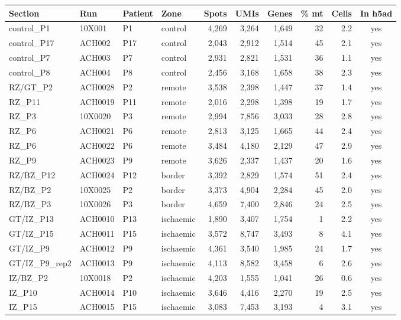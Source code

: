 \begin{longtable}{llllrrrrrc}
\toprule
Section & Run & Patient & Zone & Spots & UMIs & Genes & \% mt & Cells & In h5ad \\
\midrule
\endhead
control\_P1 & 10X001 & P1 & control & 4,269 & 3,264 & 1,649 & 32 & 2.2 & yes \\
control\_P17 & ACH002 & P17 & control & 2,043 & 2,912 & 1,514 & 45 & 2.1 & yes \\
control\_P7 & ACH003 & P7 & control & 2,931 & 2,821 & 1,531 & 36 & 1.1 & yes \\
control\_P8 & ACH004 & P8 & control & 2,456 & 3,168 & 1,658 & 38 & 2.3 & yes \\
RZ/GT\_P2 & ACH0028 & P2 & remote & 3,538 & 2,398 & 1,447 & 37 & 1.4 & yes \\
RZ\_P11 & ACH0019 & P11 & remote & 2,016 & 2,298 & 1,398 & 19 & 1.7 & yes \\
RZ\_P3 & 10X0020 & P3 & remote & 2,994 & 7,856 & 3,033 & 28 & 2.8 & yes \\
RZ\_P6 & ACH0021 & P6 & remote & 2,813 & 3,125 & 1,665 & 44 & 2.4 & yes \\
RZ\_P6 & ACH0022 & P6 & remote & 3,484 & 4,180 & 2,129 & 47 & 2.9 & yes \\
RZ\_P9 & ACH0023 & P9 & remote & 3,626 & 2,337 & 1,437 & 20 & 1.6 & yes \\
RZ/BZ\_P12 & ACH0024 & P12 & border & 3,392 & 2,829 & 1,574 & 51 & 2.4 & yes \\
RZ/BZ\_P2 & 10X0025 & P2 & border & 3,373 & 4,904 & 2,284 & 45 & 2.0 & yes \\
RZ/BZ\_P3 & 10X0026 & P3 & border & 4,659 & 7,400 & 2,846 & 24 & 2.5 & yes \\
GT/IZ\_P13 & ACH0010 & P13 & ischaemic & 1,890 & 3,407 & 1,754 & 1 & 2.2 & yes \\
GT/IZ\_P15 & ACH0011 & P15 & ischaemic & 3,572 & 8,747 & 3,493 & 8 & 4.1 & yes \\
GT/IZ\_P9 & ACH0012 & P9 & ischaemic & 4,361 & 3,540 & 1,985 & 24 & 1.7 & yes \\
GT/IZ\_P9\_rep2 & ACH0013 & P9 & ischaemic & 4,113 & 8,582 & 3,458 & 6 & 2.6 & yes \\
IZ/BZ\_P2 & 10X0018 & P2 & ischaemic & 4,203 & 1,555 & 1,041 & 26 & 0.6 & yes \\
IZ\_P10 & ACH0014 & P10 & ischaemic & 3,646 & 4,416 & 2,270 & 19 & 2.5 & yes \\
IZ\_P15 & ACH0015 & P15 & ischaemic & 3,083 & 7,453 & 3,193 & 4 & 3.1 & yes \\

\end{longtable}
